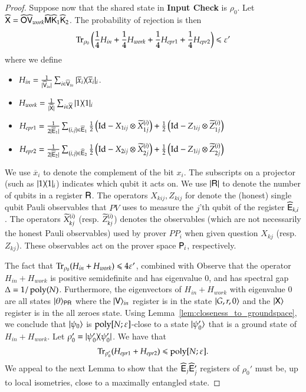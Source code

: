 \begin{proof}
Suppose now that the shared state in \textbf{Input Check} is $\rho_{0}$. Let $\widehat{{\mathsf{X}}} = \widehat{{\mathsf{O}}} \widehat{{\mathsf{V}}}_{work} \widehat{{\mathsf{M}}} \widehat{{\mathsf{K}}}_1 \widehat{{\mathsf{K}}}_2$. The probability of rejection is then
	\begin{equation}
		\Tr_{\rho_{0}} \Paren{ \frac{1}{4}H_{in} + \frac{1}{4}H_{work} + \frac{1}{4} H_{epr1} + \frac{1}{4} H_{epr2} } \leq \eps'
		\label{eq:init}
	\end{equation}
	where we define 
	\begin{itemize}
		\item $H_{in} = \frac{1}{|\widehat{{\mathsf{V}}}_{in}|} \sum_{i \in \widehat{{\mathsf{V}}}_{in}} |\overline{x}_i\rangle\! \langle \overline{x}_i|_i$.
		\item $H_{work} = \frac{1}{|\widehat{{\mathsf{X}}}|} \sum_{i \in \widehat{{\mathsf{X}}}} |1\rangle\! \langle 1|_i$
		\item $H_{epr1} = \frac{1}{2|\widehat{{\mathsf{E}}}_1|} \sum_{(i,j) \in \widehat{{\mathsf{E}}}_1} \frac{1}{2} \left( \mathop{\mathrm{Id}}\!\mathinner{} - X_{1ij} \otimes \widetilde{X}^{(i)}_{1j}\right) + \frac{1}{2} \left( \mathop{\mathrm{Id}}\!\mathinner{} - Z_{1ij} \otimes \widetilde{Z}^{(i)}_{1j}\right)$
		\item $H_{epr2} = \frac{1}{2|\widehat{{\mathsf{E}}}_2|} \sum_{(i,j) \in \widehat{{\mathsf{E}}}_2} \frac{1}{2} \left( \mathop{\mathrm{Id}}\!\mathinner{} - X_{2ij} \otimes \widetilde{X}^{(i)}_{2j}\right) + \frac{1}{2} \left( \mathop{\mathrm{Id}}\!\mathinner{} - Z_{1ij} \otimes \widetilde{Z}^{(i)}_{2j}\right)$
	\end{itemize}
	We use $\overline{x}_i$ to denote the complement of the bit $x_i$. The subscripts on a projector (such as $|1\rangle\! \langle 1|_i$) indicates which qubit it acts on. We use $|{\mathsf{R}}|$ to denote the number of qubits in a register ${\mathsf{R}}$. The operators $X_{kij},Z_{kij}$ for denote the (honest) single qubit Pauli observables that $PV$ uses to measure the $j$'th qubit of the register $\widehat{{\mathsf{E}}}_{k,i}$. The operators $\widetilde{X}^{(i)}_{kj}$ (resp. $\widetilde{Z}^{(i)}_{kj}$) denotes the observables (which are not necessarily the honest Pauli observables) used by prover $PP_i$ when given question $X_{kj}$ (resp. $Z_{kj}$). These observables act on the prover space ${\mathsf{P}}_i$, respectively.

The fact that $\operatorname{Tr}_{\rho_0} ( H_{in} + H_{work}) \leqslant 4 \varepsilon'$, combined with 
Observe that the operator $H_{in} + H_{work}$ is positive semidefinite and has eigenvalue $0$, and has spectral gap $\Delta = 1/\operatorname{poly}(N)$. Furthermore, the eigenvectors of $H_{in} + H_{work}$ with eigenvalue $0$ are all states $|\theta\rangle_{{\mathsf{P}} {\mathsf{R}}}$ where the $|{\mathsf{V}}\rangle_{in}$ register is in the state $|G,r,0\rangle$ and the $|{\mathsf{X}}\rangle$ register is in the all zeroes state. Using Lemma~\ref{lem:closeness_to_groundspace}, we conclude that $|\psi_0\rangle$ is $\operatorname{poly}[N;\varepsilon]$-close to a state $|\psi'_0\rangle$ that is a ground state of $H_{in} + H_{work}$. Let $\rho_0' = |\psi_0'\rangle\! \langle \psi_0'|$. We have that 
\begin{equation}
\label{eq:input_check_epr_hamiltonian}
	\Tr_{\rho_0'} (H_{epr1} + H_{epr2}) \leq \poly[N;\eps].
\end{equation}
We appeal to the next Lemma to show that the $\widehat{{\mathsf{E}}}_j \widehat{{\mathsf{E}}}_j'$ registers of $\rho_0'$ must be, up to local isometries, close to a maximally entangled state.


\end{proof}
